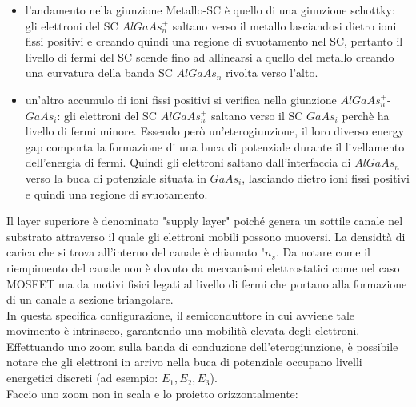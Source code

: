 \begin{itemize}
    \item l'andamento nella giunzione Metallo-SC è quello di una giunzione schottky: gli elettroni del SC $AlGaAs_n^+$ saltano verso il metallo lasciandosi dietro ioni fissi positivi e creando quindi una regione di svuotamento nel SC, pertanto il livello di fermi del SC scende fino ad allinearsi a quello del metallo creando una curvatura della banda SC $AlGaAs_n$ rivolta verso l'alto.
    \item un'altro accumulo di ioni fissi positivi si verifica nella giunzione $AlGaAs_n^+$-$GaAs_i$: gli elettroni del SC $AlGaAs_n^+$ saltano verso il SC $GaAs_i$ perchè ha livello di fermi minore. Essendo però un'eterogiunzione, il loro diverso energy gap comporta la formazione di una buca di potenziale durante il livellamento dell'energia di fermi. Quindi gli elettroni saltano dall'interfaccia di $AlGaAs_n$ verso la buca di potenziale situata in $GaAs_i$, lasciando dietro ioni fissi positivi e quindi una regione di svuotamento.
\end{itemize}

Il layer superiore è denominato "supply layer" poiché genera un sottile canale nel substrato attraverso il quale gli elettroni mobili possono muoversi. La densidtà di carica che si trova all'interno del canale è chiamato "$n_s$.
Da notare come il riempimento del canale non è dovuto da meccanismi elettrostatici come nel caso MOSFET ma da motivi fisici legati al livello di fermi che portano alla formazione di un canale a sezione triangolare.\\
In questa specifica configurazione, il semiconduttore in cui avviene tale movimento è intrinseco, garantendo una mobilità elevata degli elettroni.\\ 
Effettuando uno zoom sulla banda di conduzione dell'eterogiunzione, è possibile notare che gli elettroni in arrivo nella buca di potenziale occupano livelli energetici discreti (ad esempio: $E_1,E_2,E_3$). \\


\newpage
Faccio uno zoom non in scala e lo proietto orizzontalmente:

